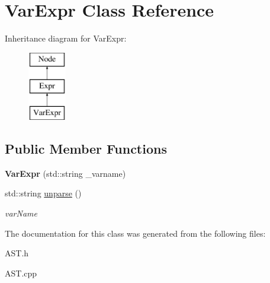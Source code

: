 \hypertarget{classVarExpr}{\section{Var\-Expr Class Reference}
\label{classVarExpr}
}
Inheritance diagram for Var\-Expr\-:\begin{figure}[H]
\begin{center}
\leavevmode
\includegraphics[height=3.000000cm]{classVarExpr}
\end{center}
\end{figure}
\subsection*{Public Member Functions}
\begin{DoxyCompactItemize}
\item 
\hypertarget{classVarExpr_a32a3cb8c9cad473719aba7df52d6ea8a}{{\bfseries Var\-Expr} (std\-::string \-\_\-varname)}\label{classVarExpr_a32a3cb8c9cad473719aba7df52d6ea8a}

\item 
\hypertarget{classVarExpr_a0decf71a2462c6e9e898c44f0fca41d3}{std\-::string \hyperlink{classVarExpr_a0decf71a2462c6e9e898c44f0fca41d3}{unparse} ()}\label{classVarExpr_a0decf71a2462c6e9e898c44f0fca41d3}

\begin{DoxyCompactList}\small\item\em var\-Name \end{DoxyCompactList}\end{DoxyCompactItemize}


The documentation for this class was generated from the following files\-:\begin{DoxyCompactItemize}
\item 
A\-S\-T.\-h\item 
A\-S\-T.\-cpp\end{DoxyCompactItemize}
